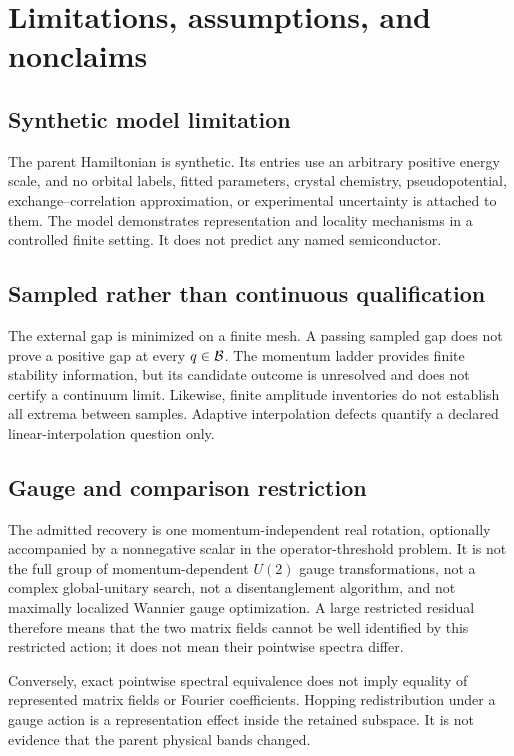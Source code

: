 \section{Limitations, assumptions, and nonclaims}

\subsection{Synthetic model limitation}

The parent Hamiltonian is synthetic.  Its entries use an arbitrary positive energy
scale, and no orbital labels, fitted parameters, crystal chemistry, pseudopotential,
exchange--correlation approximation, or experimental uncertainty is attached to them.
The model demonstrates representation and locality mechanisms in a controlled finite
setting.  It does not predict any named semiconductor.

\subsection{Sampled rather than continuous qualification}

The external gap is minimized on a finite mesh.  A passing sampled gap does not prove a
positive gap at every $q\in\mathcal B$.  The momentum ladder provides finite stability
information, but its candidate outcome is unresolved and does not certify a continuum
limit.  Likewise, finite amplitude inventories do not establish all extrema between
samples.  Adaptive interpolation defects quantify a declared linear-interpolation
question only.

\subsection{Gauge and comparison restriction}

The admitted recovery is one momentum-independent real rotation, optionally accompanied
by a nonnegative scalar in the operator-threshold problem.  It is not the full group of
momentum-dependent $U(2)$ gauge transformations, not a complex global-unitary search,
not a disentanglement algorithm, and not maximally localized Wannier gauge optimization.
A large restricted residual therefore means that the two matrix fields cannot be well
identified by this restricted action; it does not mean their pointwise spectra differ.

Conversely, exact pointwise spectral equivalence does not imply equality of represented
matrix fields or Fourier coefficients.  Hopping redistribution under a gauge action is a
representation effect inside the retained subspace.  It is not evidence that the parent
physical bands changed.


